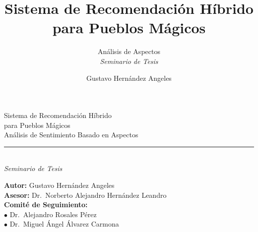 \documentclass[aspectratio=169,11pt]{beamer}
\title{Sistema de Recomendaci\'on H\'ibrido\\para Pueblos M\'agicos}
\subtitle{An\'alisis de Aspectos\\
\vspace{0.4em}\textit{Seminario de Tesis}}
\author{Gustavo Hern\'andez Angeles}
\date{}
\begin{document}
\begin{frame}[plain]
	\vspace{1.5em}
	\begin{center}
		{\color{navy}Sistema de Recomendaci\'on H\'ibrido\\para Pueblos M\'agicos}\\[0.6em]
		{\color{navy}An\'alisis de Sentimiento Basado en Aspectos}\\[0.3em]
		{\color{rule}\rule{0.5\linewidth}{0.4pt}}\\[0.4em]
		{\large\itshape Seminario de Tesis}
	\end{center}
	\vspace{1.2em}
	\begin{flushleft}
		\textbf{Autor:} Gustavo Hern\'andez Angeles\\
		\textbf{Asesor:} Dr.\ Norberto Alejandro Hern\'andez Leandro\\[0.3em]
		\textbf{Comit\'e de Seguimiento:}\\
		\quad$\bullet$ Dr.\ Alejandro Rosales P\'erez\\
		\quad$\bullet$ Dr.\ Miguel \'Angel \'Alvarez Carmona\\[0.5em]
	\end{flushleft}
\end{frame}
\end{document}
